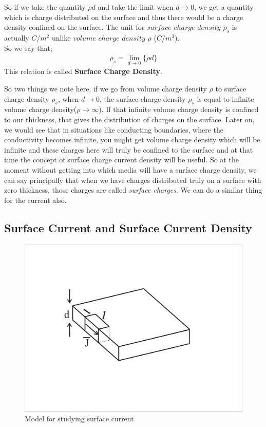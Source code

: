 So if we take the quantity $\rho d$ and take the limit when $d\rightarrow0$, we get a quantity which is charge distributed on the surface and thus there would be a charge density confined on the surface. The unit for $surface$ $charge$ $density$ $\rho_{s}$ is actually $C/m^{2}$ unlike $volume$ $charge$ $density$ $\rho$ ($C/m^{3}$).\\
So we say that;
\begin{align}
	\rho_{s}=\lim_{d\rightarrow0}\{\rho d\} 
\end{align}
This relation is called \textbf{Surface Charge Density}.

So two things we note here, if we go from volume charge density $\rho$ to surface charge density $\rho_{s}$, when $d\rightarrow0$, the surface charge density $\rho_{s}$ is equal to infinite volume charge density($\rho\rightarrow\infty$). If that infinite volume charge density is confined to our thickness, that gives the distribution of charges on the surface. Later on, we would see that in situations like conducting boundaries, where the conductivity becomes infinite, you might get volume charge density which will be infinite and these charges here will truly be confined to the surface and at that time the concept of surface charge current density will be useful. So at the moment without getting into which media will have a surface charge density, we can say principally that when we have charges distributed truly on a surface with zero thickness, those charges are called \textit{surface charges}. We can do a similar thing for the current also.

\subsection{Surface Current and Surface Current Density}
\begin{figure}[h]
	\centering
	\includegraphics[width=0.7\linewidth]{graphics/surfacecurrent}
	\caption{Model for studying surface current}
\end{figure} 


